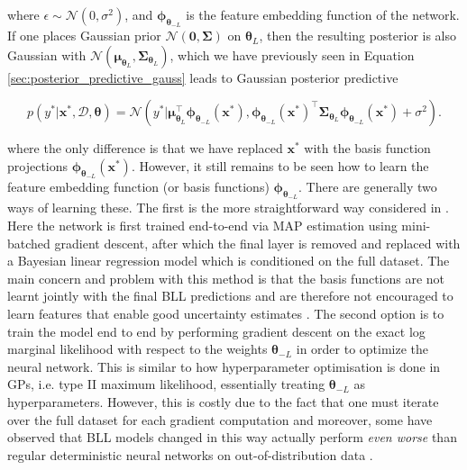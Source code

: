 \noindent where $\epsilon \sim \mathcal{N}(0, \sigma^2)$, and $\bm\phi_{\bm{\theta}_{-L}}$  is the feature embedding function of the network. If one places Gaussian prior $\mathcal{N}(\mathbf{0}, \bm\Sigma)$ on $\bm{\theta}_L$, then the resulting posterior is also Gaussian with $\mathcal{N}(\bm\mu_{\bm{\theta}_L}, \bm\Sigma_{\bm{\theta}_L})$, which we have previously seen in Equation \ref{sec:posterior_predictive_gauss} leads to Gaussian posterior predictive 

\begin{equation}
\label{eq:post_pred_vbll}
    p(y^*|\mathbf{x^*}, \mathcal{D}, \bm{\theta}) = \mathcal{N}(y^*|\bm\mu_{\bm{\theta}_L}^\top\bm\phi_{\bm{\theta}_{-L}}(\mathbf{x}^*), \bm\phi_{\bm{\theta}_{-L}}(\mathbf{x}^*)^\top\bm\Sigma_{\bm{\theta}_L}\bm\phi_{\bm{\theta}_{-L}}(\mathbf{x}^*)+\sigma^2).
\end{equation}

\noindent where the only difference is that we have replaced $\mathbf{x}^*$ with the basis function projections $\bm\phi_{\bm{\theta}_{-L}}(\mathbf{x}^*)$. However, it still remains to be seen how to learn the feature embedding function (or basis functions) $\bm\phi_{\bm{\theta}_{-L}}$. There are generally two ways of learning these. The first is the more straightforward way considered in \cite{2015_BLL}. Here the network is first trained end-to-end via MAP estimation using mini-batched gradient descent, after which the final layer is removed and replaced with a Bayesian linear regression model which is conditioned on the full dataset. The main concern and problem with this method is that the basis functions are not learnt jointly with the final BLL predictions and are therefore not encouraged to learn features that enable good uncertainty estimates \citep{ober2019benchmarking}. The second option is to train the model end to end by performing gradient descent on the exact log marginal likelihood with respect to the weights $\bm{\theta}_{-L}$ in order to optimize the neural network. This is similar to how hyperparameter optimisation is done in GPs, i.e. type II maximum likelihood, essentially treating $\bm{\theta}_{-L}$ as hyperparameters. However, this is costly due to the fact that one must iterate over the full dataset for each gradient computation and moreover, some have observed that BLL models changed in this way actually perform \textit{even worse} than regular deterministic neural networks on out-of-distribution data \citep{2021_NLMs,2021_BLLnDKL}. \\

